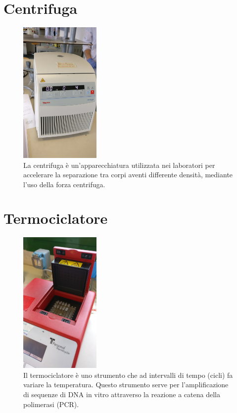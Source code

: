 \documentclass{report}
\begin{document}
	\vspace{0.5cm}


	\section{Centrifuga}

	\begin{figure}[H]

		\includegraphics[width=0.35\textwidth]{./immagini/centrifuga.jpg}
		\caption{La centrifuga è un'apparecchiatura utilizzata nei laboratori per accelerare
		la separazione tra corpi aventi differente densità, mediante l'uso della forza centrifuga.}
		\label{centrifuga}

	\end{figure}

	\vspace{0.5cm}


	\section{Termociclatore}

	\begin{figure}[H]

		\includegraphics[width=0.35\textwidth]{./immagini/termociclatore.jpg}
		\caption{Il termociclatore è uno strumento
		che ad intervalli di tempo (cicli) fa variare la temperatura.
		Questo strumento serve per l'amplificazione di sequenze di DNA in
		vitro attraverso la reazione a catena della polimerasi (PCR).}
		\label{termociclatore}

	\end{figure}
\end{document}

